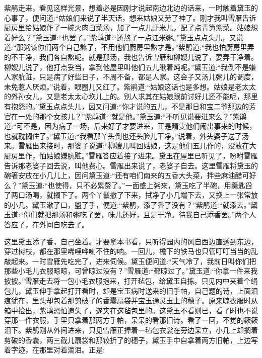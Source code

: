 \begin{parag}
    紫鹃走来，看见这样光景，想着必是因刚才说起南边北边的话来，一时触着黛玉的心事了，便问道:“姑娘们来说了半天话，想来姑娘又劳了神了。刚才我叫雪雁告诉厨房里给姑娘作了一碗火肉白菜汤，加了一点儿虾米儿，配了点青笋紫菜。姑娘想着好么？”黛玉道:“也罢了。”紫鹃道:“还熬了一点江米粥。”黛玉点点头儿，又说道:“那粥该你们两个自己熬了，不用他们厨房里熬才是。”紫鹃道:“我也怕厨房里弄的不干净，我们各自熬呢。就是那汤，我也告诉雪雁和柳嫂儿说了，要弄干净着。柳嫂儿说了，他打点妥当，拿到他屋里叫他们五儿瞅着炖呢。”黛玉道:“我倒不是嫌人家肮赃，只是病了好些日子，不周不备，都是人家。这会子又汤儿粥儿的调度，未免惹人厌烦。”说着，眼圈儿又红了。紫鹃道:“姑娘这话也是多想。姑娘是老太太的外孙女儿，又是老太太心坎儿上的。别人求其在姑娘跟前讨好儿还不能呢，那里有抱怨的。”黛玉点点头儿，因又问道:“你才说的五儿，不是那日和宝二爷那边的芳官在一处的那个女孩儿？”紫鹃道:“就是他。”黛玉道:“不听见说要进来么？”紫鹃道:“可不是，因为病了一场，后来好了才要进来，正是晴雯他们闹出事来的时候，也就耽搁住了。”黛玉道:“我看那丫头倒也还头脸儿干净。”说着，外头婆子送了汤来。雪雁出来接时，那婆子说道:“柳嫂儿叫回姑娘，这是他们五儿作的，没敢在大厨房里作，怕姑娘嫌肮赃。”雪雁答应着接了进来。黛玉在屋里已听见了，吩咐雪雁告诉那老婆子回去说，叫他费心。雪雁出来说了，老婆子自去。这里雪雁将黛玉的碗箸安放在小几儿上，因问黛玉道:“还有咱们南来的五香大头菜，拌些麻油醋可好么？”黛玉道:“也使得，只不必累赘了。”一面盛上粥来，黛玉吃了半碗，用羹匙舀了两口汤喝，就搁下了。两个丫鬟撤了下来，拭净了小几端下去，又换上一张常放的小几。黛玉漱了口，盥了手，便道:“紫鹃，添了香了没有？”紫鹃道:“就添去。”黛玉道:“你们就把那汤和粥吃了罢，味儿还好，且是干净。待我自己添香罢。”两个人答应了，在外间自吃去了。
\end{parag}


\begin{parag}
    这里黛玉添了香，自己坐着。才要拿本书看，只听得园内的风自西边直透到东边，穿过树枝，都在那里唏哩哗喇不住的响。一回儿，檐下的铁马也只管叮叮当当的乱敲起来。一时雪雁先吃完了，进来伺候。黛玉便问道:“天气冷了，我前日叫你们把那些小毛儿衣服晾晾，可曾晾过没有？”雪雁道:“都晾过了。”黛玉道:“你拿一件来我披披。”雪雁走去将一包小毛衣服抱来，打开毡包，给黛玉自拣。只见内中夹着个绢包儿，黛玉伸手拿起打开看时，却是宝玉病时送来的旧手帕，自己题的诗，上面泪痕犹在，里头却包着那剪破了的香囊扇袋并宝玉通灵玉上的穗子。原来晾衣服时从箱中捡出，紫鹃恐怕遗失了，遂夹在这毡包里的。这黛玉不看则已，看了时也不说穿那一件衣服，手里只拿着那两方手帕，呆呆的看那旧诗。看了一回，不觉的簌簌泪下。紫鹃刚从外间进来，只见雪雁正捧着一毡包衣裳在旁边呆立，小几上却搁着剪破的香囊，两三截儿扇袋和那铰折了的穗子，黛玉手中自拿着两方旧帕，上边写着字迹，在那里对着滴泪。正是:
\end{parag}



